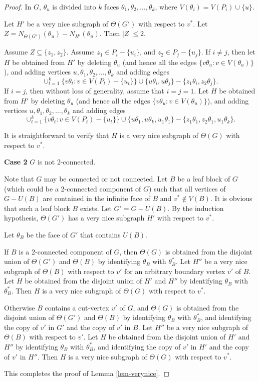 \documentclass[11pt,a4paper]{article}
\theoremstyle{definition}
\begin{document}
\begin{proof}
    
    In $G$, $\theta_u$ is divided into $k$ faces $\theta_1, \theta_2, \ldots, \theta_k$, where $V(\theta_i) = V(P_i) \cup \{u\}$. 
    
    Let $H'$ be a very nice subgraph of $\Theta(G')$ with respect to $v^*$. Let $Z=N_{\Theta(G')}(\theta_u) -N_{H'}(\theta_u)$. Then $|Z| \le 2$. 
    
    Assume $Z \subseteq \{z_1,z_2\}$. Assume   $z_1 \in P_i - \{u_i\}$, and $z_2 \in P_j-\{u_j\}$. 
    If $i \ne j$, then let $H$ be obtained from $H'$ by deleting  $\theta_u$ (and hence all the  edges $\{v\theta_u: v \in V(\theta_u)\}$), and adding vertices $u, \theta_1,\theta_2,
    \ldots, \theta_k$ and adding  edges 
    $$\cup_{t=1}^k\{v\theta_t: v \in V(P_t)-\{u_t\}\} \cup \{u\theta_i,u\theta_j\} - \{z_1\theta_i,z_2\theta_j\}.$$ 
    If $i=j$, then without loss of generality, assume that 
$i=j=1$. Let 
$H$ be obtained from $H'$ by deleting  $\theta_u$ (and hence all the  edges $\{v\theta_u: v \in V(\theta_u)\}$), and adding vertices $u, \theta_1,\theta_2,
    \ldots, \theta_k$ and adding  edges   
    $$\cup_{t=1}^k\{v\theta_t: v \in V(P_t)-\{u_t\}\} \cup \{u\theta_1, u\theta_k, u_1\theta_1\} - \{z_1\theta_1,z_2\theta_1, u_1\theta_k\}.$$

    It is straightforward to verify that $H$ is a very nice subgraph of $\Theta(G)$ with respect to $v^*$.  


\medskip
\noindent
{\bf Case 2} 
 $G$ is not 2-connected.
 \medskip

Note that $G$ may be connected or not connected. Let $B$ be a leaf block of $G$ (which could be a 2-connected component of $G$) such that
all vertices of $G-U(B)$ are contained in the infinite face of $B$ and $v^* \notin V(B)$. It is obvious that such a leaf block $B$ exists. Let $G'=G-U(B)$. By the induction hypothesis, $\Theta(G')$ has a very nice subgraph $H'$ with respect to $v^*$.  

Let $\theta_B$ be the face of $G'$ that contains $U(B)$. 

If $B$ is a 2-connected component of $G$, then $\Theta(G)$ is obtained from the disjoint union of $\Theta(G')$ and $\Theta(B)$ by identifying $\theta_B$ with $\theta^*_B$. Let $H''$ be a very nice subgraph of $\Theta(B)$ with respect to $v'$ for an arbitrary boundary vertex $v'$ of $B$. Let $H$ be obtained from the disjoint union of $H'$ and $H''$ by identifying $\theta_B$ with $\theta^*_B$. Then $H$ is a very nice subgraph of $\Theta(G)$ with respect to $v^*$. 

Otherwise $B$ contains a cut-vertex $v'$ of $G$, and $\Theta(G)$ is obtained from the disjoint union of $\Theta(G')$ and $\Theta(B)$ by identifying $\theta_B$ with $\theta^*_B$, and identifying the copy of $v'$ in $G'$ and the copy of $v'$ in $B$. Let $H''$ be a very nice subgraph of $\Theta(B)$ with respect to $v'$. Let $H$ be obtained from the disjoint union of $H'$ and $H''$ by identifying $\theta_B$ with $\theta^*_B$, and identifying the copy of $v'$ in $H'$ and the copy of $v'$ in $H''$.   Then $H$ is a very nice subgraph of $\Theta(G)$ with respect to $v^*$. 

This completes the proof of Lemma \ref{lem-verynice}.
\end{proof}
\end{document}
